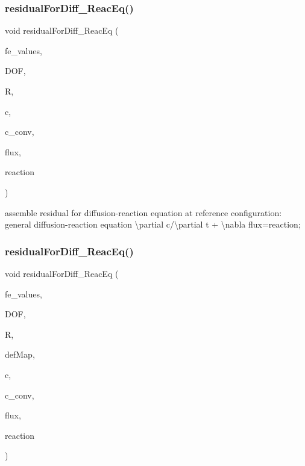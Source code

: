 \subsubsection{\texorpdfstring{residualForDiff\_ReacEq()}{residualForDiff\_ReacEq()}\hspace{0.1cm}{\footnotesize\ttfamily [1/2]}}
{\footnotesize\ttfamily void residual\+For\+Diff\+\_\+\+Reac\+Eq (\begin{DoxyParamCaption}\item[{const F\+E\+Values$<$ dim $>$ \&}]{fe\+\_\+values,  }\item[{unsigned int}]{D\+OF,  }\item[{dealii\+::\+Table$<$ 1, T $>$ \&}]{R,  }\item[{dealii\+::\+Table$<$ 1, T $>$ \&}]{c,  }\item[{dealii\+::\+Table$<$ 1, double $>$ \&}]{c\+\_\+conv,  }\item[{dealii\+::\+Table$<$ 2, T $>$ \&}]{flux,  }\item[{dealii\+::\+Table$<$ 1, T $>$ \&}]{reaction }\end{DoxyParamCaption})}

assemble residual for diffusion-\/reaction equation at reference configuration\+: general diffusion-\/reaction equation \textbackslash{}partial c/\textbackslash{}partial t + \textbackslash{}nabla flux=reaction; \mbox{\label{class_residual_aa88dcdddfeefb2ba5f1f1196d8608b70}} 
\subsubsection{\texorpdfstring{residualForDiff\_ReacEq()}{residualForDiff\_ReacEq()}\hspace{0.1cm}{\footnotesize\ttfamily [2/2]}}
{\footnotesize\ttfamily void residual\+For\+Diff\+\_\+\+Reac\+Eq (\begin{DoxyParamCaption}\item[{const F\+E\+Values$<$ dim $>$ \&}]{fe\+\_\+values,  }\item[{unsigned int}]{D\+OF,  }\item[{dealii\+::\+Table$<$ 1, T $>$ \&}]{R,  }\item[{\mbox{\hyperlink{structdeformation_map}{deformation\+Map}}$<$ T, dim $>$ \&}]{def\+Map,  }\item[{dealii\+::\+Table$<$ 1, T $>$ \&}]{c,  }\item[{dealii\+::\+Table$<$ 1, double $>$ \&}]{c\+\_\+conv,  }\item[{dealii\+::\+Table$<$ 2, T $>$ \&}]{flux,  }\item[{dealii\+::\+Table$<$ 1, T $>$ \&}]{reaction }\end{DoxyParamCaption})}

